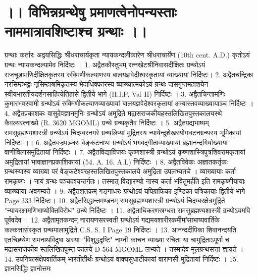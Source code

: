 \chapter{।। विभिन्नग्रन्थेषु प्रमाणत्वेनोपन्यस्ताः नाममात्रावशिष्टाश्च ग्रन्थाः ।। }
		ग्रन्थाः 										कर्तारः
अद्वयसिद्धिः										श्रीधराचार्यकृता
न्यायकन्दलीकारेण श्रीधराचार्येण (10th cent. A.D.) कृतोऽयं ग्रन्थः न्यायकन्दल्यामेव निर्दिष्टः ।
1. अद्वैतकौस्तुभम् 								रत्नखेटश्रीनिवासदीक्षितः
	ग्रन्थोऽयं राजचूडामणिदीक्षितकृतस्य रुक्मिणीकल्याणस्य बालयज्ञवेदीश्वरकृतायां व्याख्यायां निर्दिष्टः। 
2. अद्वैतचन्द्रिका									नरसिम्हभट्टः
	नृसिम्हाश्रमिकृतस्य भेदाधिक्कारस्य व्याख्यात्मकोऽयं ग्रन्थः दासगुप्तमहाशयेन स्वीयभारतीयदर्शनसाहित्येतिहासे द्वितीये भागे (H.I.P. Val II) निर्दिष्टः । 
3. अद्वैतचिन्तामणिः								कुमारभवस्वामी
	ग्रन्थोऽयं रुक्मिणीकल्याणव्याख्यायां बालयज्ञवेदेश्वरकृतायां अम्बास्तवव्याख्यायाञ्च निर्दिष्टः ।
4. अद्वैतप्रकाशकः								वासुदेवज्ञानमुनिः
	ग्रन्थोऽयं अमुद्रिते मद्रासराजकीयहस्तलिखितपुस्तकालयस्थे कैवल्यरत्नाख्ये (R. 3620 MGOML) ग्रन्थे ग्रन्थकृतैव निर्दिष्टः । 
5. अद्वैतपद्यभाष्यम् 								रामसुब्रह्मण्यशास्त्री
	ग्रन्थोऽयं चिदम्बरनगरे	ग्रन्थलिप्यां मुद्रितस्य न्यायेन्दुशेखरयोगधटनग्रन्थस्य भूमिकायां निर्दिष्टः ।। 
6. अद्वैतवज्रपञ्जरः								वेङ्कटनाथः
	ग्रन्थोऽयं भगवद्गीताव्याख्यायां ब्रह्मानन्दगिर्याख्यायां वाणीविलासमुद्रितायां निर्दिष्टः ।
7. अद्वैतविद्याविजयः								कृष्णशास्त्री
	ग्रन्थोऽयं कृष्णशास्त्रिपुत्रशिवरामकृतायां अमुद्रितायां भावाज्ञानप्रकाशिकायां (54. A. 16. A.L) निर्दिष्टः । 
8. अद्वैतविवेकः									अज्ञातकर्तृकः
	ग्रन्थस्यास्य व्याख्या परं वेङ्कटेश्वरहस्तलिखितपुस्तकालये अमुद्रिता उपलभ्यतचे । व्याख्यायाः कर्ता रामकृष्णः । नायं ग्रन्थः पञ्चदश्यन्तर्गतः। तस्मात् विद्यारण्यो नास्य कर्ता भवितुमर्हति इति रामकृष्णीयायाः व्याख्याया अवगम्यते ।
9. अद्वैतशतकम् 									गङ्गाधरः
	ग्रन्थोऽयं यपिग्राफिका इण्डिका पत्रिकायाः द्वितीये भागे Page 333 निर्दिष्टः।
10. अद्वैतसिद्धान्तमण्डनम् 						रामसुब्रह्मण्यशास्त्री
	ग्रन्थोऽयं चिदम्बरक्षेत्रमुद्रिते "न्यायरक्षामणिभाष्योक्तिविरोध" ग्रन्थे निर्दिष्टः । 
11. अद्वैताधिकरणस्रग्धरा							रामसुब्रह्मण्यशास्त्री
	ग्रन्थोऽयमपि पूर्ववदेव । 
12. अद्वैतामृतकन्दम् 								नारायणसरस्वती
	ग्रन्थोऽयं गद्यमयशारीरकमीमांसाभाष्यवार्तिके कल्कत्तासंस्कृत ग्रन्थमालामुद्रिते C.S. S. I Page 19 निर्दिष्टः । 
13. आनन्ददीपिका								शिवानन्दयति
	एतच्छिष्येण रामनाथविदुषा अस्याः "विशुद्धदृष्टि" नाम्नी काचन व्याख्या रचिता या चामुद्रिताऽपूर्णा च मद्रासराजकीय स्तलिखितपुस्त कालये D 564 MGOML लभ्यते । तस्मादेव मूलग्रन्थसत्ता ज्ञायते ।
14. उपनिषत्संक्षेपवार्तिकम्						भारतीतीर्थः
	ग्रन्थोऽयं वाक्यसुधाटीकायां वाराणसी मुद्रितायां निर्दिष्टः ।
15. ज्ञानसिद्धिः 									ज्ञानोत्तमः
